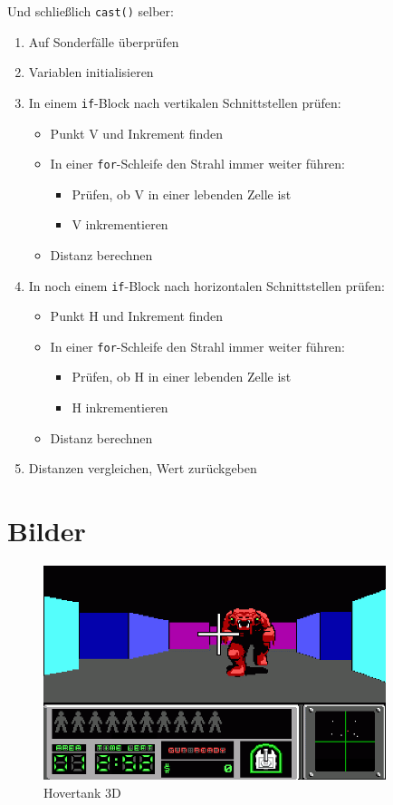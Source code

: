 \documentclass[a4paper,12pt]{report}
\begin{document}
Und schlie\ss lich \texttt{cast()} selber:
\begin{spacing}{1.0}
\begin{framed}
\begin{enumerate}
	\item Auf Sonderf\"alle \"uberpr\"ufen
	\item Variablen initialisieren
	\item In einem \texttt{if}-Block nach vertikalen Schnittstellen pr\"ufen:
	\begin{itemize}
		\item Punkt V und Inkrement finden
		\item In einer \texttt{for}-Schleife den Strahl immer weiter f\"uhren:
		\begin{itemize}
			\item Pr\"ufen, ob V in einer lebenden Zelle ist
			\item V inkrementieren
		\end{itemize}
		\item Distanz berechnen
	\end{itemize}
	\item In noch einem \texttt{if}-Block nach horizontalen Schnittstellen pr\"ufen:
	\begin{itemize}
		\item Punkt H und Inkrement finden
		\item In einer \texttt{for}-Schleife den Strahl immer weiter f\"uhren:
		\begin{itemize}
			\item Pr\"ufen, ob H in einer lebenden Zelle ist
			\item H inkrementieren
		\end{itemize}
		\item Distanz berechnen
	\end{itemize}
	\item Distanzen vergleichen, Wert zur\"uckgeben
\end{enumerate}
\end{framed}
\end{spacing}

\chapter{Bilder}
\begin{figure}[htbp] 
        \centering
        \includegraphics[width=10cm]{hovertank.png} 
		\caption{Hovertank 3D}
\end{figure}
\end{document}
